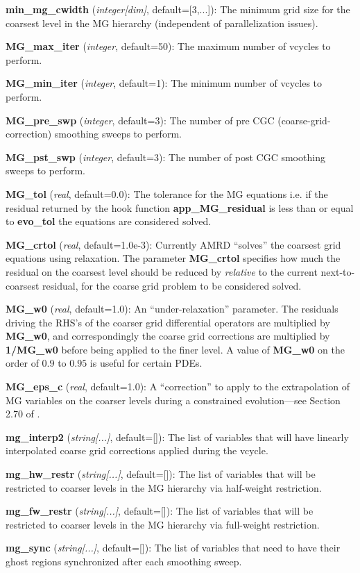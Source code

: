 \documentclass[aps,amssymb,unsortedaddress,nofootinbib]{revtex4}
\def\lsep{\itemsep 0.05in}
\begin{document}
\begin{list}{}{\lsep}
\item {\bf min\_mg\_cwidth} ({\em integer[dim]}, default=[3,...]):
      The minimum grid size for the coarsest level in the MG hierarchy (independent
      of parallelization issues).
\item {\bf MG\_max\_iter} ({\em integer}, default=50):
      The maximum number of vcycles to perform.
\item {\bf MG\_min\_iter} ({\em integer}, default=1):
      The minimum number of vcycles to perform.
\item {\bf MG\_pre\_swp} ({\em integer}, default=3):
      The number of pre CGC (coarse-grid-correction) smoothing sweeps to perform.
\item {\bf MG\_pst\_swp} ({\em integer}, default=3):
      The number of post CGC smoothing sweeps to perform.
\item {\bf MG\_tol} ({\em real}, default=0.0):
      The tolerance for the MG equations  i.e. if the residual returned by 
      the hook function {\bf app\_MG\_residual}
      is less than or equal to {\bf evo\_tol} the equations are considered solved.
\item {\bf MG\_crtol} ({\em real}, default=1.0e-3):
      Currently AMRD ``solves'' the coarsest grid equations using relaxation.
      The parameter {\bf MG\_crtol} specifies how much the residual on the coarsest
      level should be reduced by {\em relative} to the current next-to-coarsest
      residual, for the coarse grid problem to be considered solved.
\item {\bf MG\_w0} ({\em real}, default=1.0):
      An ``under-relaxation'' parameter. The residuals driving the RHS's of the
      coarser grid differential operators are multiplied by {\bf MG\_w0}, and
      correspondingly the coarse grid corrections are multiplied by {\bf 1/MG\_w0}
      before being applied to the finer level. A value of {\bf MG\_w0} on the
      order of $0.9$ to $0.95$ is useful for certain PDEs.
\item {\bf MG\_eps\_c} ({\em real}, default=1.0): A ``correction'' to apply
      to the extrapolation of MG variables on the coarser levels during
      a constrained evolution---see Section 2.70 of \cite{fpthesis}.
\item {\bf mg\_interp2} ({\em string[...]}, default=[]):
      The list of variables that will have linearly interpolated
      coarse grid corrections applied during the vcycle.
\item {\bf mg\_hw\_restr} ({\em string[...]}, default=[]):
      The list of variables that will be restricted to coarser levels
      in the MG hierarchy via half-weight restriction.
\item {\bf mg\_fw\_restr} ({\em string[...]}, default=[]):
      The list of variables that will be restricted to coarser levels
      in the MG hierarchy via full-weight restriction.
\item {\bf mg\_sync} ({\em string[...]}, default=[]):
      The list of variables that need to have their ghost regions synchronized
      after each smoothing sweep.
\end{list}
\end{document}
